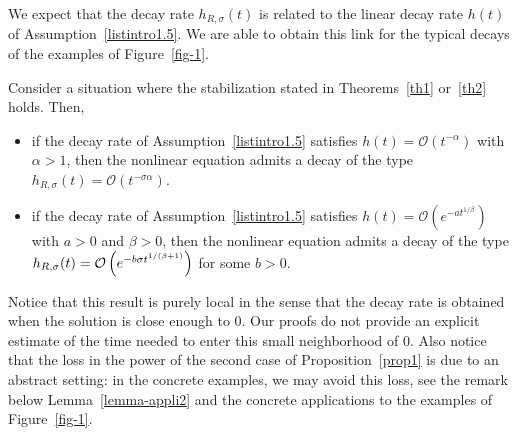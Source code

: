 \documentclass[10pt]{amsart}
\theoremstyle{definition}\newtheorem{defi}[theo]{Definition}\newtheorem{rema}[theo]{Remark}\newtheorem{exam}[theo]{Example}\newtheorem{exem}[theo]{Example}\newtheorem{nota}[theo]{Notation}
\newcommand{\Oc}{\mathcal{O}}
\begin{document}
We expect that the decay rate $h_{R,\sigma}(t)$ is related to the linear decay rate $h(t)$ of Assumption~\eqref{listintro1.5}. We are able to obtain this link for the typical decays of the examples of Figure~\ref{fig-1}.

\begin{prop}\label{prop1}
Consider a situation where the stabilization stated in Theorems~\ref{th1} or~\ref{th2} holds. Then,
\begin{itemize}
\item if the decay rate of Assumption~\eqref{listintro1.5} satisfies $h(t)=\Oc({t^{-\alpha}})$ with $\alpha>1$, then the nonlinear equation admits a decay of the type $h_{R,\sigma}(t)= \Oc (t^{-\sigma\alpha})$.
\item if the decay rate of Assumption~\eqref{listintro1.5} satisfies $h(t)=\Oc \left(e^{-a {t^{1/\beta}}}\right)$ with $a>0$ and $\beta>0$, then the nonlinear equation admits a decay of the type $h_{R,\sigma}(t)\linebreak= \Oc \left(e^{-b\sigma t^{1/(\beta+1)}}\right)$ for some $b>0$.
\end{itemize}
\end{prop}

Notice that this result is purely local in the sense that the decay rate is obtained when the solution is close enough to $0$. Our proofs do not provide an explicit estimate of the time needed to enter this small neighborhood of $0$. Also notice that the loss in the power of the second case of Proposition~\ref{prop1} is due to an abstract setting: in the concrete examples, we may avoid this loss, see the remark below Lemma~\ref{lemma-appli2} and the concrete applications to the examples of Figure~\ref{fig-1}.
\end{document}
